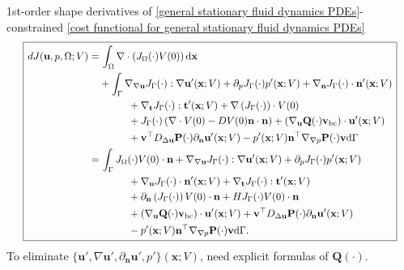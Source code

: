 \documentclass[10pt
hyperref={
    pdfauthor={Hong Quan Ba Nguyen},
    pdftitle={Optimal Shape Design of Air Ducts in Combustion Engines: Design a General Framework},
    pdfsubject={Talk},
    pdfcreator={LaTeX},
}
]{beamer}
\begin{document}
\begin{frame}{1st-order shape derivatives of \eqref{general stationary fluid dynamics PDEs}-constrained \eqref{cost functional for general stationary fluid dynamics PDEs}}
    \vspace{-5mm}
    \begin{equation*}
        \scalebox{0.9}{%
        \boxed{\left.\begin{split}
                dJ(\textbf{u},p,\Omega;V) =&\, \int_\Omega \nabla\cdot\left(J_\Omega(\cdot)V(0)\right){\rm d}\textbf{x}\\
                &+ \int_\Gamma \nabla_{\nabla\textbf{u}}J_\Gamma(\cdot):\nabla\textbf{u}'(\textbf{x};V) + \partial_pJ_\Gamma(\cdot)p'(\textbf{x};V) + \nabla_{\textbf{n}}J_\Gamma(\cdot)\cdot\textbf{n}'(\textbf{x};V)\\
                &\hspace{1cm}+ \nabla_{\textbf{t}}J_\Gamma(\cdot):\textbf{t}'(\textbf{x};V) + \nabla\left(J_\Gamma(\cdot)\right)\cdot V(0)\\
                &\hspace{1cm}+ J_\Gamma(\cdot)\left(\nabla\cdot V(0) - DV(0)\textbf{n}\cdot\textbf{n}\right) + \left(\nabla_{\textbf{u}}\textbf{Q}(\cdot)\textbf{v}_{\rm bc}\right)\cdot\textbf{u}'(\textbf{x};V)\\
                &\hspace{1cm}+ \textbf{v}^\top D_{\Delta\textbf{u}}\textbf{P}(\cdot)\partial_{\textbf{n}}\textbf{u}'(\textbf{x};V) - p'(\textbf{x};V)\textbf{n}^\top\nabla_{\nabla p}\textbf{P}(\cdot)\textbf{v}{\rm d}\Gamma\\
                =&\, \int_\Gamma J_\Omega(\cdot)V(0)\cdot\textbf{n} + \nabla_{\nabla\textbf{u}}J_\Gamma(\cdot):\nabla\textbf{u}'(\textbf{x};V) + \partial_pJ_\Gamma(\cdot)p'(\textbf{x};V)\\
                &\hspace{1cm}+ \nabla_{\textbf{n}}J_\Gamma(\cdot)\cdot\textbf{n}'(\textbf{x};V) + \nabla_{\textbf{t}}J_\Gamma(\cdot):\textbf{t}'(\textbf{x};V)\\
                &\hspace{1cm}+ \partial_{\textbf{n}}\left(J_\Gamma(\cdot)\right)V(0)\cdot\textbf{n} + HJ_\Gamma(\cdot)V(0)\cdot\textbf{n}\\
                &\hspace{1cm}+ (\nabla_{\textbf{u}}\textbf{Q}(\cdot)\textbf{v}_{\rm bc})\cdot\textbf{u}'(\textbf{x};V) + \textbf{v}^\top D_{\Delta\textbf{u}}\textbf{P}(\cdot)\partial_{\textbf{n}}\textbf{u}'(\textbf{x};V)\\
                &\hspace{1cm}- p'(\textbf{x};V)\textbf{n}^\top\nabla_{\nabla p}\textbf{P}(\cdot)\textbf{v}{\rm d}\Gamma.
            \end{split}\right.}}
    \end{equation*}
    To eliminate $\{\textbf{u}',\nabla\textbf{u}',\partial_{\textbf{n}}\textbf{u}',p'\}(\textbf{x};V)$, need explicit formulas of $\textbf{Q}(\cdot)$.
\end{frame}
\end{document}
